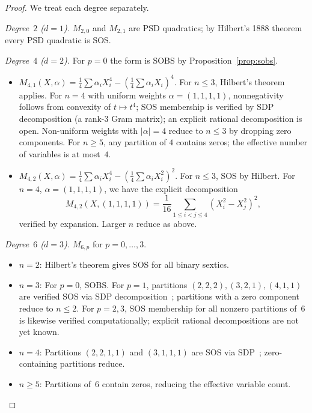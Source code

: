 \documentclass{amsart}
\theoremstyle{definition}
\numberwithin{equation}{section}
\begin{document}
\begin{proof}
We treat each degree separately.

\noindent\textit{Degree~$2$ ($d=1$).}
$M_{2,0}$ and $M_{2,1}$ are PSD quadratics; by Hilbert's 1888 theorem every
PSD quadratic is SOS.

\noindent\textit{Degree~$4$ ($d=2$).}
For $p=0$ the form is SOBS by Proposition~\ref{prop:sobs}.
\begin{itemize}
  \item[$p=1$:] $M_{4,1}(X,\alpha)=\frac14\sum\alpha_iX_i^4-(\frac14\sum\alpha_iX_i)^4$.
  For $n\le3$, Hilbert's theorem applies.  For $n=4$ with uniform weights
  $\alpha=(1,1,1,1)$, nonnegativity follows from convexity of $t\mapsto t^4$;
  SOS membership is verified by SDP decomposition (a rank-$3$ Gram matrix);
  an explicit rational decomposition is open.  Non-uniform weights with
  $|\alpha|=4$ reduce to $n\le3$ by dropping zero components.
  For $n\ge5$, any partition of $4$ contains zeros; the effective number of
  variables is at most~$4$.

  \item[$p=2$:] $M_{4,2}(X,\alpha)=\frac14\sum\alpha_iX_i^4-(\frac14\sum\alpha_iX_i^2)^2$.
  For $n\le3$, SOS by Hilbert.  For $n=4$, $\alpha=(1,1,1,1)$, we have the
  explicit decomposition
  \[
  M_{4,2}(X,(1,1,1,1))=\frac1{16}\sum_{1\le i<j\le4}(X_i^2-X_j^2)^2,
  \]
  verified by expansion.  Larger $n$ reduce as above.
\end{itemize}

\noindent\textit{Degree~$6$ ($d=3$).}
$M_{6,p}$ for $p=0,\dots,3$.
\begin{itemize}
  \item $n=2$: Hilbert's theorem gives SOS for all binary sextics.
  \item $n=3$: For $p=0$, SOBS.  For $p=1$, partitions
  $(2,2,2),(3,2,1),(4,1,1)$ are verified SOS via SDP
  decomposition~\cite{GMIr}; partitions with a zero component reduce to
  $n\le2$.  For $p=2,3$, SOS membership for all nonzero partitions of~$6$ is
  likewise verified computationally; explicit rational decompositions are
  not yet known.
  \item $n=4$: Partitions $(2,2,1,1)$ and $(3,1,1,1)$ are SOS via
  SDP~\cite{GMIr}; zero-containing partitions reduce.
  \item $n\ge5$: Partitions of~$6$ contain zeros, reducing the effective
  variable count.
\end{itemize}
\vspace{-\baselineskip}
\end{proof}
\end{document}
